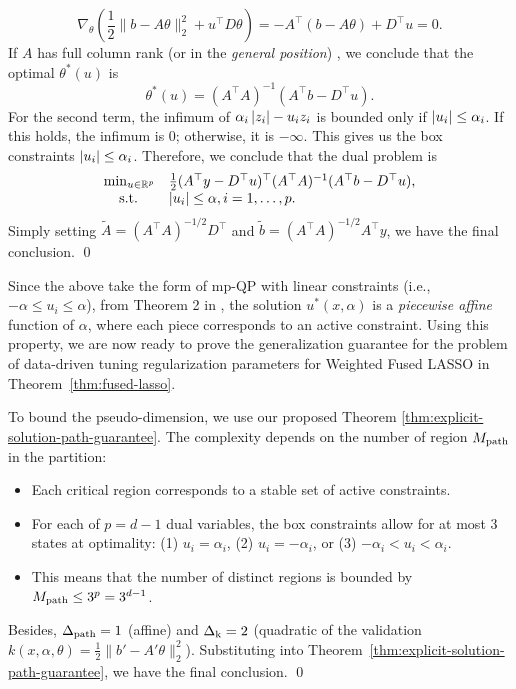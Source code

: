     \[
        \nabla_\theta\left(\frac{1}{2}\|b - A\theta\|_2^2 + u^\top D\theta\right) = -A^\top(b - A\theta) + D^\top u = 0.
    \]
    If $A$ has full column rank (or in the \textit{general position}) \citep{tibshirani2011solution}, we conclude that the optimal $\theta^*(u)$ is
    \[
        \theta^*(u) = (A^\top A)^{-1}(A^\top b - D^\top u).
    \]
    For the second term, the infimum of $\alpha_{i}\left| z_i \right| - u_iz_i$ is bounded only if $\left| u_i \right| \leq \alpha_i$. If this holds, the infimum is $0$; otherwise, it is $-\infty$. This gives us the box constraints $\left| u_i \right| \leq \alpha_i$. 
    Therefore, we conclude that the dual problem is
    \begin{equation*}
        \begin{array}{cl}
            \min_{u \in \mathbb{R}^p}  & \frac{1}{2}(A^\top y - D^\top u)^\top (A^\top A)^{-1}(A^\top b - D^\top u), \\
            \textup{ s.t. } & \left| u_i \right| \leq \alpha, i = 1, \dots, p.
        \end{array}
    \end{equation*}
     Simply setting  $\tilde{A} = (A^\top A)^{-1/2}D^\top$ and $\tilde{b} = (A^\top A)^{-1/2}A^\top y$, we have the final conclusion.
\qed

Since the above take the form of mp-QP with linear constraints (i.e., $-\alpha \leq u_i \leq \alpha$), from Theorem 2 in \citet{bemporad2002explicit}, the solution $u^*(x, \alpha)$ is a \textit{piecewise affine} function of $\alpha$, where each piece corresponds to an active constraint. Using this property, we are now ready to prove the generalization guarantee for the problem of data-driven tuning regularization parameters for Weighted Fused LASSO in Theorem~\ref{thm:fused-lasso}.

    To bound the pseudo-dimension, we use our proposed Theorem \ref{thm:explicit-solution-path-guarantee}. The complexity depends on the number of region $M_{\textup{path}}$ in the partition:
    \begin{itemize}[leftmargin=*]
        \item Each critical region corresponds to a stable set of active constraints. 
        \item For each of $p = d - 1$ dual variables, the box constraints allow for at most $3$ states at optimality: (1) $u_i = \alpha_i$, (2) $u_i = -\alpha_i$, or (3) $-\alpha_i < u_i < \alpha_i$.
        \item This means that the number of distinct regions is bounded by $M_\textup{path} \leq 3^p = 3^{d - 1}$.
    \end{itemize}
    Besides, $\Delta_\textup{path} = 1$ (affine) and $\Delta_\textup{k} = 2$ (quadratic of the validation $k(x, \alpha, \theta) = \frac{1}{2}\|b' - A'\theta\|_2^2$). Substituting into Theorem~\ref{thm:explicit-solution-path-guarantee}, we have the final conclusion.
\qed



